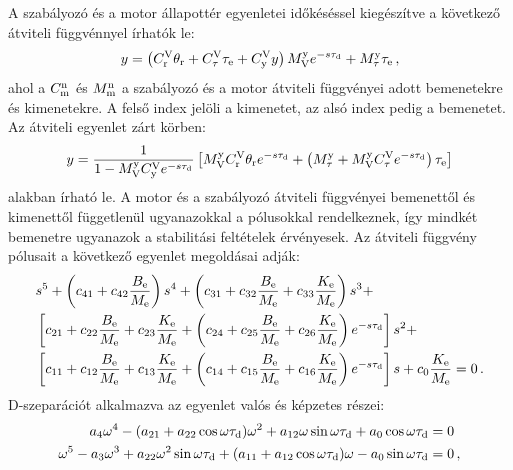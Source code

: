 A szabályozó és a motor állapottér egyenletei időkéséssel kiegészítve a következő átviteli 
függvénnyel írhatók le:
\begin{align}
    \begin{split}
        y = \left(C^{\mathrm{V}}_{\mathrm{r}} \theta_{\mathrm{r}} + 
        C^{\mathrm{V}}_{\mathrm{\tau}} \tau_{\mathrm{e}} +
        C^{\mathrm{V}}_{\mathrm{y}} y\right)M^{\mathrm{y}}_{\mathrm{V}} e^{-s\tau_{\mathrm{d}}} +
        M^{\mathrm{y}}_{\mathrm{\tau}} \tau_{\mathrm{e}}\,,
    \end{split}
\end{align}
ahol a \(C^{\mathrm{n}}_{\mathrm{m}}\) és \(M^{\mathrm{n}}_{\mathrm{m}}\) a szabályozó és a motor átviteli függvényei adott 
bemenetekre és kimenetekre. A felső index jelöli a kimenetet, az alsó index pedig a bemenetet.
Az átviteli egyenlet zárt körben:
\begin{align}
    \begin{split}
        y = \frac{1}{1 - M^{\mathrm{y}}_{\mathrm{V}} C^{\mathrm{V}}_{\mathrm{y}} e^{-s\tau_{\mathrm{d}}}}
        \left[
            M^{\mathrm{y}}_{\mathrm{V}} C^{\mathrm{V}}_{\mathrm{r}} \theta_{\mathrm{r}} e^{-s\tau_{\mathrm{d}}} + 
            \left(M^{\mathrm{y}}_{\mathrm{\tau}} + M^{\mathrm{y}}_{\mathrm{V}} C^{\mathrm{V}}_{\mathrm{\tau}} e^{-s\tau_{\mathrm{d}}}\right) \tau_{\mathrm{e}}
        \right]
    \end{split}
\end{align}
alakban írható le. A motor és a szabályozó átviteli függvényei bemenettől és kimenettől 
függetlenül ugyanazokkal a pólusokkal rendelkeznek, így mindkét bemenetre ugyanazok a stabilitási 
feltételek érvényesek. Az átviteli függvény pólusait a következő egyenlet megoldásai adják:
\begin{align}\label{eq:delay_characteristic}
    \begin{split}
        &s^5 + 
        \left(c_{41} + c_{42}\frac{B_{\mathrm{e}}}{M_{\mathrm{e}}}\right)s^4 +
        \left(c_{31} + c_{32}\frac{B_{\mathrm{e}}}{M_{\mathrm{e}}} + c_{33}\frac{K_{\mathrm{e}}}{M_{\mathrm{e}}}\right)s^3 + \\
        &\left[c_{21} + c_{22}\frac{B_{\mathrm{e}}}{M_{\mathrm{e}}} + c_{23}\frac{K_{\mathrm{e}}}{M_{\mathrm{e}}} + \left(
        c_{24} + c_{25}\frac{B_{\mathrm{e}}}{M_{\mathrm{e}}} + c_{26}\frac{K_{\mathrm{e}}}{M_{\mathrm{e}}}\right)e^{-s\tau_{\mathrm{d}}}\right]s^2 + \\
        &\left[c_{11} + c_{12}\frac{B_{\mathrm{e}}}{M_{\mathrm{e}}} + c_{13}\frac{K_{\mathrm{e}}}{M_{\mathrm{e}}} + \left(
        c_{14} + c_{15}\frac{B_{\mathrm{e}}}{M_{\mathrm{e}}} + c_{16}\frac{K_{\mathrm{e}}}{M_{\mathrm{e}}}\right)e^{-s\tau_{\mathrm{d}}}\right]s + 
        c_0 \frac{K_{\mathrm{e}}}{M_{\mathrm{e}}} = 0\,.
    \end{split}
\end{align}
D-szeparációt alkalmazva az egyenlet valós és 
képzetes részei:
\begin{align}\label{eq:delay_complex_separation}
    \begin{split}
        a_4\omega^4-(a_{21} + a_{22}\cos{\omega\tau_{\mathrm{d}}})\omega^2+a_{12}\omega\sin{\omega\tau_{\mathrm{d}}} + a_0\cos{\omega\tau_{\mathrm{d}}} &= 0 \\
        \omega^5 -a_3\omega^3 + a_{22}\omega^2\sin{\omega\tau_{\mathrm{d}}} + (a_{11} + a_{12}\cos{\omega\tau_{\mathrm{d}}})\omega - a_0\sin{\omega\tau_{\mathrm{d}}}  &= 0 \,,
    \end{split}
\end{align}
